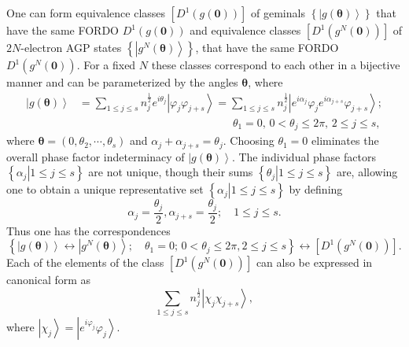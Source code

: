 \documentclass[aps,preprint]{revtex4}%
\begin{document}
One can form equivalence classes $\left[  D^{1}\left(  g\left(  \bm{0}\right)
\right)  \right]  $ of geminals $\left\{  \left\vert g\left(
\bm{\theta}\right)  \right\rangle \right\}  $ that have the same FORDO
$D^{1}\left(  g\left(  \bm{0}\right)  \right)  $ and equivalence classes
$\left[  D^{1}\left(  g^{N}\left(  \bm{0}\right)  \right)  \right]  $ of
$2N$-electron AGP states $\left\{  \left\vert g^{N}\left(
\bm{\theta }\right)  \right\rangle \right\}  $, that have the same FORDO
$D^{1}\left(  g^{N}\left(  \bm{0}\right)  \right)  $. For a fixed $N$ these
classes correspond to each other in a bijective manner \cite{Yukalov00} and
can be parameterized by the angles $\bm{\theta}$, where
\begin{align}
\left\vert g\left(  \bm{\theta}\right)  \right\rangle  &  =\sum_{1\leq j\leq
s}n_{j}^{\frac{1}{2}}e^{i\theta_{j}}\left\vert \varphi_{j}\varphi
_{j+s}\right\rangle =\sum_{1\leq j\leq s}n_{j}^{\frac{1}{2}}\left\vert
e^{i\alpha_{j}}\varphi_{j}e^{i\alpha_{j+s}}\varphi_{j+s}\right\rangle
;\nonumber\\
&  \qquad\qquad\qquad\qquad\qquad\qquad\qquad\theta_{1}=0,\,0<\theta_{j}%
\leq2\pi,\,2\leq j\leq s,
\end{align}
where $\bm{\theta=}\left(  0,\theta_{2},\cdots,\theta_{s}\right)  $ and
$\alpha_{j}+\alpha_{j+s}=\theta_{j}$. Choosing $\theta_{1}=0$ eliminates the
overall phase factor indeterminacy of $\left\vert g\left(
\bm{\theta }\right)  \right\rangle $. The individual phase factors $\left\{
\left.  \alpha_{j}\right\vert 1\leq j\leq s\right\}  $ are not unique, though
their sums $\left\{  \left.  \theta_{j}\right\vert 1\leq j\leq s\right\}  $
are, allowing one to obtain a unique representative set $\left\{  \left.
\alpha_{j}\right\vert 1\leq j\leq s\right\}  $ by defining
\begin{equation}
\alpha_{j}=\frac{\theta_{j}}{2},\alpha_{j+s}=\frac{\theta_{j}}{2};\quad1\leq
j\leq s.
\end{equation}
Thus one has the correspondences
\begin{equation}
\left\{  \left\vert g\left(  \bm{\theta}\right)  \right\rangle
\longleftrightarrow\left\vert g^{N}\left(  \bm{\theta}\right)  \right\rangle
;\quad\theta_{1}=0;\,0<\theta_{j}\leq2\pi,2\leq j\leq s\right\}
\longleftrightarrow\left[  D^{1}\left(  g^{N}\left(  \bm{0}\right)  \right)
\right]  .
\end{equation}
Each of the elements of the class $\left[  D^{1}\left(  g^{N}\left(
\bm{0}\right)  \right)  \right]  $ can also be expressed in canonical form as
\begin{equation}
\sum_{1\leq j\leq s}n_{j}^{\frac{1}{2}}\left\vert \chi_{j}\chi_{j+s}%
\right\rangle ,
\end{equation}
where $\left\vert \chi_{j}\right\rangle =\left\vert e^{i\varphi_{j}}%
\varphi_{j}\right\rangle $.
\end{document}
